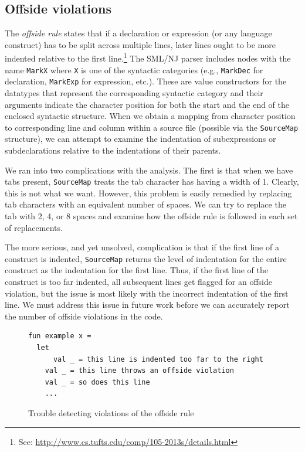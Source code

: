 \documentclass[12pt,abstracton]{scrartcl}
\begin{document}
\subsection{Offside violations}\label{subsec:offside}
The \emph{offside rule} states that if a declaration or expression (or any language construct)
has to be split across multiple lines, later lines ought to be more indented relative to
the first line.\footnote{See: \url{http://www.cs.tufts.edu/comp/105-2013s/details.html}}
The SML/NJ parser includes nodes with the name \texttt{MarkX} where \texttt{X} is
one of the syntactic categories (e.g., \texttt{MarkDec} for declaration, \texttt{MarkExp} for expression,
etc.). These are value constructors for the datatypes that represent the corresponding
syntactic category and their arguments indicate the character position for both the start and the
end of the enclosed syntactic structure. When we obtain a mapping from character position
to corresponding line and column within a source file (possible via the \texttt{SourceMap} structure),
we can attempt to examine the indentation of subexpressions or subdeclarations relative to
the indentations of their parents.

We ran into two complications with the analysis. The first is that when we have tabs present,
\texttt{SourceMap} treats the tab character has having a width of 1. Clearly,
this is not what we want. However, this problem is easily remedied 
by replacing tab characters with an equivalent number of spaces.
We can try to replace the tab with 2, 4, or 8 spaces and examine how
the offside rule is followed in each set of replacements.

The more serious, and yet unsolved, complication is that if the first line of a construct
is indented, \texttt{SourceMap} returns the level of indentation
for the entire construct as the indentation for the first line.
Thus, if the first line of the construct is too far indented, all subsequent
lines get flagged for an offside violation, but the issue is most likely
with the incorrect indentation of the first line. We must address this
issue in future work before we can accurately report the number
of offside violations in the code.
\begin{figure}[bh!]
\centering
\begin{verbatim}
fun example x =
  let
      val _ = this line is indented too far to the right
    val _ = this line throws an offside violation
    val _ = so does this line
    ...
\end{verbatim}
\caption{Trouble detecting violations of the offside rule}
\label{fig:offside}
\end{figure}
\end{document}
